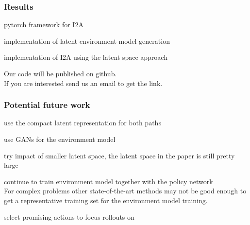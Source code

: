 \begin{frame}
	\frametitle{Results}
	\begin{PraesentationAufzaehlung}
		\item pytorch framework for I2A
		\item implementation of latent environment model generation
		\item implementation of I2A using the latent space approach
	\end{PraesentationAufzaehlung}
	
	\bigskip
	Our code will be published on github.\\
	If you are interested send us an email to get the link.
\end{frame}


\begin{frame}
	\frametitle{Potential future work}
	\begin{PraesentationAufzaehlung}
		\item use the compact latent representation for both paths
	\item use GANs for the environment model
	\item try impact of smaller latent space, the latent space in the paper is still pretty large
	
	\item continue to train environment model together with the policy network\\
	For complex problems other state-of-the-art methods may not be good enough to get a representative training set for the environment model training.
	\item select promising actions to focus rollouts on
	\end{PraesentationAufzaehlung}
\end{frame}

